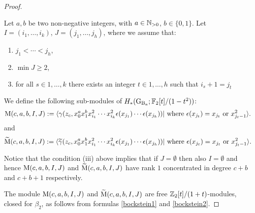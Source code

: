 \begin{proof}
\begin{df} \label{def:modules}
Let $a,b$ be two non-negative integers, with  $a \in {\mathbb{N}}_{>0}$, $b \in \{0,1\}.$ 
Let $I = (i_1, \ldots, i_k)$, $J = (j_1, \ldots, j_h)$, where we assume that:
\begin{enumerate}[label=(\roman*)]
	\item $j_1 < \cdots <j_h$,
	\item $\min J \geq 2$,
	\item for all $s \in 1, \ldots, k$ there exists an integer $t \in 1, \ldots, h$ such that $i_s+1 = j_t$ 
\end{enumerate}  
We define the following sub-modules of $H_*(\operatorname{G_{B_{n}}}; \mathbb{F}_2[t]/(1-t^2))$:
$$\operatorname{\mathrm{M}}(c,a,b,I,J) := \langle
\operatorname{\gamma} (z_c, x_0^a x_1^b x_{i_1}^2 \cdots x_{i_k}^2\epsilon(x_{j_1})\cdots \epsilon(x_{j_h})) | \mbox{ where }\epsilon(x_{j_t}) = x_{j_t} \mbox{ or }  x_{j_t-1}^2 \rangle.$$
and
$$\widetilde{\mathrm{M}}(c,a,b,I,J) := \langle
\widetilde{\gamma} (z_c, x_0^a x_1^b x_{i_1}^2 \cdots x_{i_k}^2\epsilon(x_{j_1})\cdots \epsilon(x_{j_h})) | \mbox{ where }\epsilon(x_{j_t}) = x_{j_t} \mbox{ or }  x_{j_t-1}^2 \rangle.$$
\end{df}
\begin{rem} \label{rem:Jvuoto}
Notice that the condition (iii) above implies that if $J= \emptyset$ then also $I = \emptyset$ and hence $\operatorname{\mathrm{M}}(c,a,b,I,J)$ and $\widetilde{\mathrm{M}}(c,a,b,I,J)$ have rank $1$ concentrated in degree $c+b$ and $c+b+1$ respectively. 
\end{rem}

The module $\operatorname{\mathrm{M}}(c,a,b,I,J)$ and $\widetilde{\mathrm{M}}(c,a,b,I,J)$ are  free $\mathbb{Z}_2[t]/(1+t)$-modules, closed for $\beta_2$, as follows from formulas \eqref{bockstein1} and \eqref{bockstein2}.


\end{proof}
